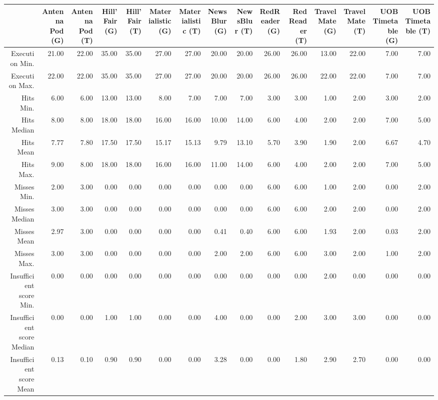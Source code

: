 \begin{table}[ht]
\centering
\begin{tabular}{rrrrrrrrrrrrrrr}
  \hline
 & Antenna Pod (G) & Antenna Pod (T) & Hill'Fair (G) & Hill'Fair (T) & Materialistic (G) & Materialistic (T) & NewsBlur (G) & NewsBlur (T) & RedReader (G) & RedReader (T) & Travel Mate (G) & Travel Mate (T) & UOB Timetable (G) & UOB Timetable (T) \\ 
  \hline
Execution Min. & 21.00 & 22.00 & 35.00 & 35.00 & 27.00 & 27.00 & 20.00 & 20.00 & 26.00 & 26.00 & 13.00 & 22.00 & 7.00 & 7.00 \\ 
  Execution Max. & 22.00 & 22.00 & 35.00 & 35.00 & 27.00 & 27.00 & 20.00 & 20.00 & 26.00 & 26.00 & 22.00 & 22.00 & 7.00 & 7.00 \\ 
  Hits Min. & 6.00 & 6.00 & 13.00 & 13.00 & 8.00 & 7.00 & 7.00 & 7.00 & 3.00 & 3.00 & 1.00 & 2.00 & 3.00 & 2.00 \\ 
  Hits Median & 8.00 & 8.00 & 18.00 & 18.00 & 16.00 & 16.00 & 10.00 & 14.00 & 6.00 & 4.00 & 2.00 & 2.00 & 7.00 & 5.00 \\ 
  Hits Mean & 7.77 & 7.80 & 17.50 & 17.50 & 15.17 & 15.13 & 9.79 & 13.10 & 5.70 & 3.90 & 1.90 & 2.00 & 6.67 & 4.70 \\ 
  Hits Max. & 9.00 & 8.00 & 18.00 & 18.00 & 16.00 & 16.00 & 11.00 & 14.00 & 6.00 & 4.00 & 2.00 & 2.00 & 7.00 & 5.00 \\ 
  Misses Min. & 2.00 & 3.00 & 0.00 & 0.00 & 0.00 & 0.00 & 0.00 & 0.00 & 6.00 & 6.00 & 1.00 & 2.00 & 0.00 & 2.00 \\ 
  Misses Median & 3.00 & 3.00 & 0.00 & 0.00 & 0.00 & 0.00 & 0.00 & 0.00 & 6.00 & 6.00 & 2.00 & 2.00 & 0.00 & 2.00 \\ 
  Misses Mean & 2.97 & 3.00 & 0.00 & 0.00 & 0.00 & 0.00 & 0.41 & 0.40 & 6.00 & 6.00 & 1.93 & 2.00 & 0.03 & 2.00 \\ 
  Misses Max. & 3.00 & 3.00 & 0.00 & 0.00 & 0.00 & 0.00 & 2.00 & 2.00 & 6.00 & 6.00 & 3.00 & 2.00 & 1.00 & 2.00 \\ 
  Insufficient score Min. & 0.00 & 0.00 & 0.00 & 0.00 & 0.00 & 0.00 & 0.00 & 0.00 & 0.00 & 0.00 & 2.00 & 0.00 & 0.00 & 0.00 \\ 
  Insufficient score Median & 0.00 & 0.00 & 1.00 & 1.00 & 0.00 & 0.00 & 4.00 & 0.00 & 0.00 & 2.00 & 3.00 & 3.00 & 0.00 & 0.00 \\ 
  Insufficient score Mean & 0.13 & 0.10 & 0.90 & 0.90 & 0.00 & 0.00 & 3.28 & 0.00 & 0.00 & 1.80 & 2.90 & 2.70 & 0.00 & 0.00 \\ 

\end{tabular}
\end{table}

